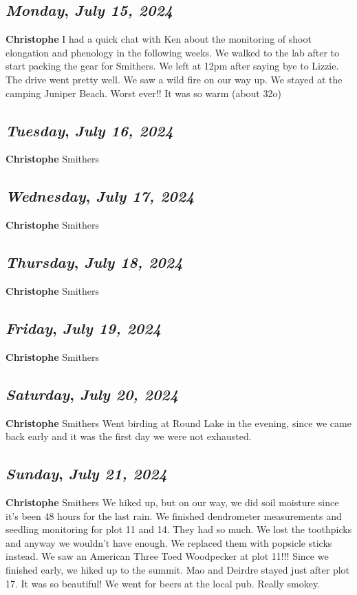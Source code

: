 \def\day{\textit{July 15, 2024}}
\def\weekday{\textit{Monday}}
\subsection*{\weekday, \day}
\textbf {Christophe}
I had a quick chat with Ken about the monitoring of shoot elongation and phenology in the following weeks. We walked to the lab after to start packing the gear for Smithers. We left at 12pm after saying bye to Lizzie.\\
The drive went pretty well. We saw a wild fire on our way up. We stayed at the camping Juniper Beach. Worst ever!! It was so warm (about 32o)

\def\day{\textit{July 16, 2024}}
\def\weekday{\textit{Tuesday}}
\subsection*{\weekday, \day}
\textbf {Christophe}
Smithers
\def\day{\textit{July 17, 2024}}
\def\weekday{\textit{Wednesday}}
\subsection*{\weekday, \day}
\textbf {Christophe}
Smithers
\def\day{\textit{July 18, 2024}}
\def\weekday{\textit{Thursday}}
\subsection*{\weekday, \day}
\textbf {Christophe}
Smithers
\def\day{\textit{July 19, 2024}}
\def\weekday{\textit{Friday}}
\subsection*{\weekday, \day}
\textbf {Christophe}
Smithers
\def\day{\textit{July 20, 2024}}
\def\weekday{\textit{Saturday}}
\subsection*{\weekday, \day}
\textbf {Christophe}
Smithers
Went birding at Round Lake in the evening, since we came back early and it was the first day we were not exhausted.

\def\day{\textit{July 21, 2024}}
\def\weekday{\textit{Sunday}}
\subsection*{\weekday, \day}
\textbf {Christophe}
Smithers
We hiked up, but on our way, we did soil moisture since it's been 48 hours for the last rain. 
We finished dendrometer measurements and seedling monitoring for plot 11 and 14. They had so much. We lost the toothpicks and anyway we wouldn't have enough. We replaced them with popsicle sticks instead.
We saw an American Three Toed Woodpecker at plot 11!!!
Since we finished early, we hiked up to the summit. Mao and Deirdre stayed just after plot 17. It was so beautiful!
We went for beers at the local pub. Really smokey.
\def\day{\textit{July 22, 2024}}
\def\weekday{\textit{Monday}}
